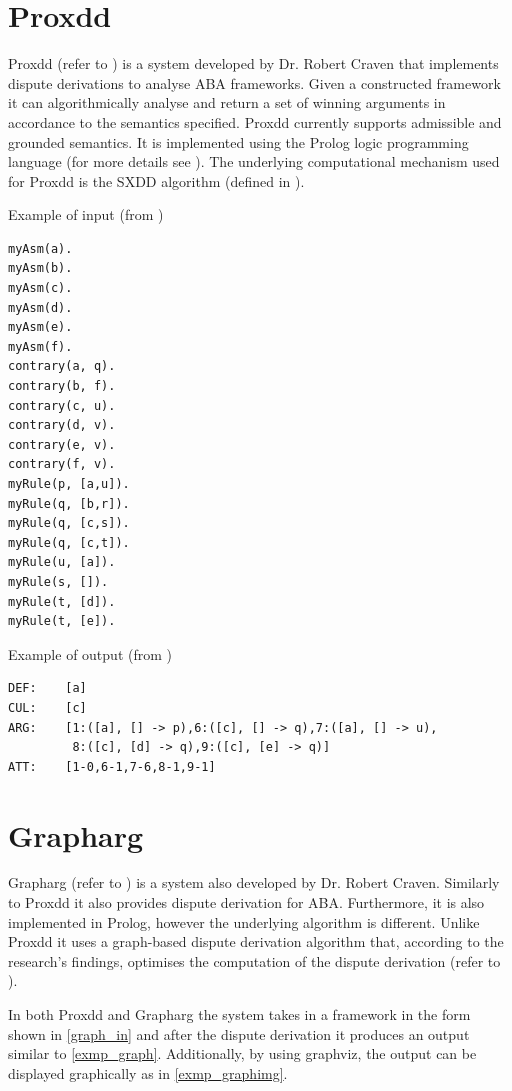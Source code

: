 \section{Proxdd} \label{subsec:proxdd}
Proxdd (refer to \cite{proxddsys}) is a system developed by Dr. Robert Craven that implements dispute derivations to analyse ABA frameworks. Given a constructed framework it can algorithmically analyse and return a set of winning arguments in accordance to the semantics specified. Proxdd currently supports admissible and grounded semantics. It is implemented using the Prolog logic programming language (for more details see \cite{proxddsys}). The underlying computational mechanism used for Proxdd is the SXDD algorithm (defined in \cite{proxdd}).

\begin{exmp} Example of input (from \cite{proxddsys}) \label{graph_in}
\begin{verbatim}
myAsm(a). 
myAsm(b). 
myAsm(c). 
myAsm(d). 
myAsm(e). 
myAsm(f). 
contrary(a, q). 
contrary(b, f). 
contrary(c, u). 
contrary(d, v). 
contrary(e, v). 
contrary(f, v). 
myRule(p, [a,u]). 
myRule(q, [b,r]). 
myRule(q, [c,s]). 
myRule(q, [c,t]).
myRule(u, [a]). 
myRule(s, []). 
myRule(t, [d]). 
myRule(t, [e]). 
\end{verbatim}
\end{exmp}

\begin{exmp} Example of output (from \cite{proxddsys})
\begin{verbatim}
DEF:	[a] 
CUL:	[c]
ARG:	[1:([a], [] -> p),6:([c], [] -> q),7:([a], [] -> u), 
		 8:([c], [d] -> q),9:([c], [e] -> q)] 
ATT:	[1-0,6-1,7-6,8-1,9-1] 
\end{verbatim}
\end{exmp}

\section{Grapharg} \label{subsec:grapharg}
Grapharg (refer to \cite{graphargsys}) is a system also developed by Dr. Robert Craven. Similarly to Proxdd it also provides dispute derivation for ABA. Furthermore, it is also implemented in Prolog, however the underlying algorithm is different. Unlike Proxdd it uses a graph-based dispute derivation algorithm that, according to the research's findings, optimises the computation of the dispute derivation (refer to \cite{grapharg}).

In both Proxdd and Grapharg the system takes in a framework in the form shown in \cref{graph_in} and after the dispute derivation it produces an output similar to \cref{exmp_graph}. Additionally, by using graphviz, the output can be displayed graphically as in \cref{exmp_graphimg}. 
\newline

